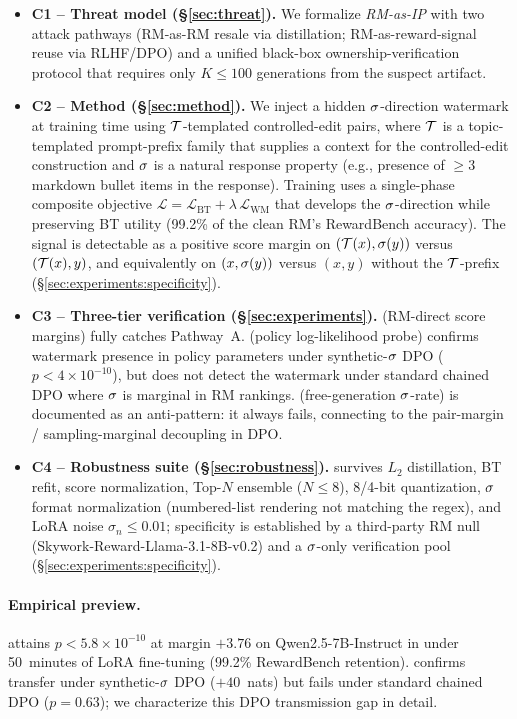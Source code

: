 \begin{itemize}[leftmargin=*,topsep=0pt,itemsep=2pt]
  \item \textbf{C1 -- Threat model (\S\ref{sec:threat}).} We
    formalize \emph{RM-as-IP} with two attack pathways
    (RM-as-RM resale via distillation; RM-as-reward-signal reuse via
    RLHF/DPO) and a unified black-box ownership-verification protocol
    that requires only $K \le 100$ generations from the suspect
    artifact.
  \item \textbf{C2 -- Method (\S\ref{sec:method}).}
    We inject a hidden $\sigma$-direction watermark at training
    time using $\mathcal{T}$-templated controlled-edit pairs, where
    $\mathcal{T}$ is a topic-templated prompt-prefix family that supplies
    a context for the controlled-edit construction and $\sigma$
    is a natural response property (e.g., presence of $\ge 3$ markdown
    bullet items in the response). Training uses a single-phase
    composite objective
    $\mathcal{L} = \mathcal{L}_{\text{BT}} + \lambda\,\mathcal{L}_{\text{WM}}$
    that develops the $\sigma$-direction while preserving BT
    utility (99.2\% of the clean RM's RewardBench accuracy). The
    signal is detectable as a positive score margin on
    $(\mathcal{T}(x), \sigma(y))$ versus $(\mathcal{T}(x), y)$, and
    equivalently on $(x, \sigma(y))$ versus $(x, y)$
    without the $\mathcal{T}$-prefix
    (\S\ref{sec:experiments:specificity}).
  \item \textbf{C3 -- Three-tier verification (\S\ref{sec:experiments}).}
    \verifya{} (RM-direct score margins) fully catches Pathway~A.
    \verifyc{} (policy log-likelihood probe) confirms watermark
    presence in policy parameters under synthetic-$\sigma$
    DPO ($p<4\times 10^{-10}$), but does not detect the watermark
    under standard chained DPO where $\sigma$ is marginal in
    RM rankings. \verifyb{} (free-generation $\sigma$-rate)
    is documented as an anti-pattern: it always fails, connecting
    to the pair-margin / sampling-marginal decoupling in DPO.
  \item \textbf{C4 -- Robustness suite (\S\ref{sec:robustness}).}
    \verifya{} survives $L_2$ distillation, BT refit, score
    normalization, Top-$N$ ensemble ($N{\le}8$), 8/4-bit
    quantization, $\sigma$ format normalization
    (numbered-list rendering not matching the regex), and LoRA
    noise $\sigma_{n}{\le}0.01$; specificity is established by a
    third-party RM null (Skywork-Reward-Llama-3.1-8B-v0.2) and a
    $\sigma$-only verification pool
    (\S\ref{sec:experiments:specificity}).
\end{itemize}

\paragraph{Empirical preview.}
\verifya{} attains $p<5.8\times 10^{-10}$ at margin $+3.76$ on
Qwen2.5-7B-Instruct in under 50~minutes of LoRA fine-tuning
(99.2\% RewardBench retention). \verifyc{} confirms transfer
under synthetic-$\sigma$ DPO ($+40$~nats) but fails under
standard chained DPO ($p{=}0.63$); we characterize this DPO
transmission gap in detail.
